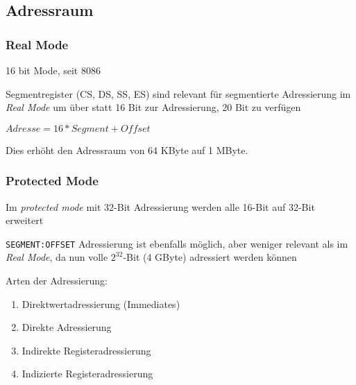 \subsection{Adressraum}

\subsubsection{Real Mode}

16 bit Mode, seit 8086

Segmentregister (CS, DS, SS, ES) sind relevant für segmentierte Adressierung im
\emph{Real Mode} um über statt 16 Bit zur Adressierung, 20 Bit zu verfügen

$Adresse = 16 * Segment + Offset$

Dies erhöht den Adressraum von 64 KByte auf 1 MByte.


\subsubsection{Protected Mode}
Im \emph{protected mode} mit 32-Bit Adressierung werden alle 16-Bit auf 32-Bit erweitert

\texttt{SEGMENT:OFFSET} Adressierung ist ebenfalls möglich, aber weniger relevant als im
\emph{Real Mode}, da nun volle $2^{32}$-Bit (4 GByte) adressiert werden können




Arten der Adressierung:

\begin{enumerate}
\item Direktwertadressierung (Immediates)
\item Direkte Adressierung
\item Indirekte Registeradressierung
\item Indizierte Registeradressierung
\end{enumerate}


